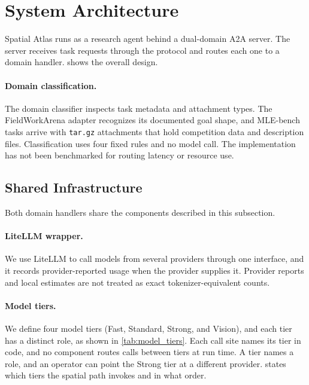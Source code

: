 \documentclass{article}
\begin{document}
\section{System Architecture}
\label{sec:architecture}

Spatial Atlas runs as a research agent behind a dual-domain A2A server. The server receives task requests through the protocol and routes each one to a domain handler.  shows the overall design.



\paragraph{Domain classification.}
The domain classifier inspects task metadata and attachment types. The FieldWorkArena adapter recognizes its documented goal shape, and MLE-bench tasks arrive with \texttt{tar.gz} attachments that hold competition data and description files. Classification uses four fixed rules and no model call. The implementation has not been benchmarked for routing latency or resource use.

\subsection{Shared Infrastructure}
\label{sec:shared}

Both domain handlers share the components described in this subsection.

\paragraph{LiteLLM wrapper.}
We use LiteLLM \citep{litellm2024} to call models from several providers through one interface, and it records provider-reported usage when the provider supplies it. Provider reports and local estimates are not treated as exact tokenizer-equivalent counts.

\paragraph{Model tiers.}
We define four model tiers (Fast, Standard, Strong, and Vision), and each tier has a distinct role, as shown in \cref{tab:model_tiers}. Each call site names its tier in code, and no component routes calls between tiers at run time. A tier names a role, and an operator can point the Strong tier at a different provider.  states which tiers the spatial path invokes and in what order.
\end{document}
